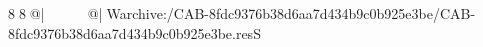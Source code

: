 8  8  @|                                                   @| W   archive:/CAB-8fdc9376b38d6aa7d434b9c0b925e3be/CAB-8fdc9376b38d6aa7d434b9c0b925e3be.resS 